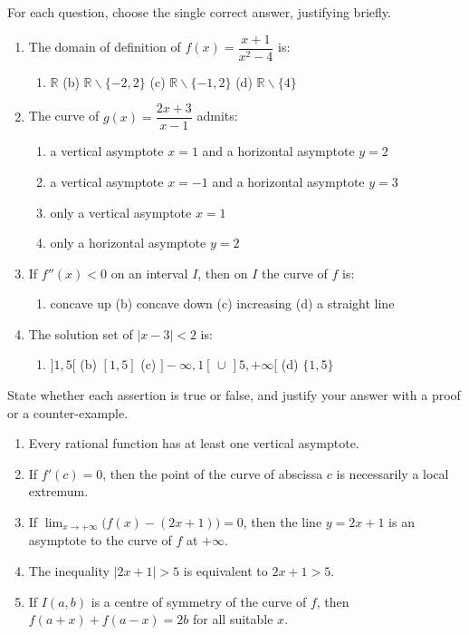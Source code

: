 \documentclass[11pt]{article}
\def\setminus{\mathbin{\backslash}}\let\smallsetminus\setminus
\begin{document}
\begin{exercice}
For each question, choose the single correct answer, justifying briefly.
\begin{enumerate}
\item The domain of definition of $f(x)=\dfrac{x+1}{x^{2}-4}$ is:
\begin{enumerate}
\item $\mathbb{R}$ \quad (b) $\mathbb{R}\setminus\{-2,2\}$ \quad (c) $\mathbb{R}\setminus\{-1,2\}$ \quad (d) $\mathbb{R}\setminus\{4\}$
\end{enumerate}
\item The curve of $g(x)=\dfrac{2x+3}{x-1}$ admits:
\begin{enumerate}
\item a vertical asymptote $x=1$ and a horizontal asymptote $y=2$
\item a vertical asymptote $x=-1$ and a horizontal asymptote $y=3$
\item only a vertical asymptote $x=1$
\item only a horizontal asymptote $y=2$
\end{enumerate}
\item If $f''(x)<0$ on an interval $I$, then on $I$ the curve of $f$ is:
\begin{enumerate}
\item concave up \quad (b) concave down \quad (c) increasing \quad (d) a straight line
\end{enumerate}
\item The solution set of $|x-3|<2$ is:
\begin{enumerate}
\item $]1,5[$ \quad (b) $[1,5]$ \quad (c) $]-\infty,1[\,\cup\,]5,+\infty[$ \quad (d) $\{1,5\}$
\end{enumerate}
\end{enumerate}
\end{exercice}

\begin{exercice}
State whether each assertion is true or false, and justify your answer with a proof or a counter-example.
\begin{enumerate}
\item Every rational function has at least one vertical asymptote.
\item If $f'(c)=0$, then the point of the curve of abscissa $c$ is necessarily a local extremum.
\item If $\lim_{x\to+\infty}\big(f(x)-(2x+1)\big)=0$, then the line $y=2x+1$ is an asymptote to the curve of $f$ at $+\infty$.
\item The inequality $|2x+1|>5$ is equivalent to $2x+1>5$.
\item If $I(a,b)$ is a centre of symmetry of the curve of $f$, then $f(a+x)+f(a-x)=2b$ for all suitable $x$.
\end{enumerate}
\end{exercice}
\end{document}
